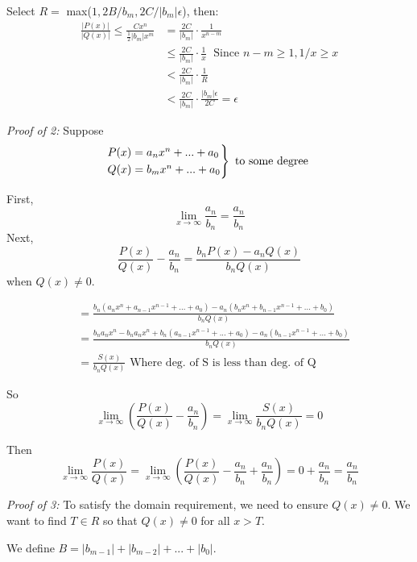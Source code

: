 \documentclass{article}
\begin{document}
Select $R =$ max($1, 2B/b_m, 2C/|b_m|\epsilon$), then:\\
\begin{align*}
  \frac{|P(x)|}{|Q(x)|} \leq \frac{Cx^n}{\frac{1}{2}|b_m|x^m} &= \frac{2C}{|b_m|} \cdot \frac{1}{x^{n-m}}\\
                                                  &\leq \frac{2C}{|b_m|}\cdot \frac{1}{x}\; \text{  Since   } n-m \geq 1, 1/x \geq x\\
                                                  &< \frac{2C}{|b_m|} \cdot \frac{1}{R}\\
                                                  &< \frac{2C}{|b_m|} \cdot \frac{|b_m|\epsilon}{2C} = \epsilon
\end{align*}

\medskip

\textit{Proof of 2:} Suppose \[
  \begin{rcases*}
      P(x) = a_nx^n + ... + a_0 \\
      Q(x) = b_mx^n + ... + a_0
  \end{rcases*} \text{ to some degree }\]

\noindent First, $$\lim_{x\rightarrow \infty} \frac{a_n}{b_n} = \frac{a_n}{b_n}$$
Next, $$\frac{P(x)}{Q(x)} - \frac{a_n}{b_n} = \frac{b_nP(x) - a_n Q(x)}{b_nQ(x)}$$ when $Q(x) \neq 0$.

\begin{align*}
  &= \frac{b_n(a_n x^n + a_{n-1} x^{n-1} + ... +a_0) - a_n (b_n x^n + b_{n-1} x^{n-1} + ... +b_0)}{b_n Q(x)}\\
  &= \frac{b_n a_n x^n - b_n a_n x^n + b_n(a_{n-1} x^{n-1} + ... +a_0) - a_n(b_{n-1} x^{n-1} + ... +b_0) }{b_n Q(x)}\\
  &= \frac{S(x)}{b_n Q(x)} \text{  Where deg. of S is less than deg. of Q}
\end{align*}

So $$\lim_{x\rightarrow \infty} (\frac{P(x)}{Q(x)} - \frac{a_n}{b_n}) = \lim_{x\rightarrow \infty} \frac{S(x)}{b_n Q(x)} = 0$$

Then $$\lim_{x\rightarrow \infty} \frac{P(x)}{Q(x)} = \lim_{x\rightarrow \infty} (\frac{P(x)}{Q(x)} - \frac{a_n}{b_n} + \frac{a_n}{b_n}) = 0 + \frac{a_n}{b_n} = \frac{a_n}{b_n}$$

\medskip

\textit{Proof of 3:} To satisfy the domain requirement, we need to ensure $Q(x) \neq 0$. We want to find $T\in R$ so that $Q(x) \neq 0$ for all $x>T$.

We define $B = |b_{m-1}| + |b_{m-2}| + ... + |b_0|$.
\end{document}
